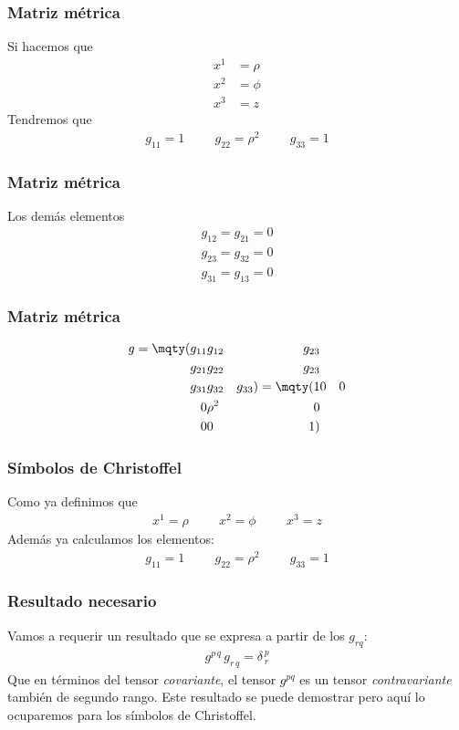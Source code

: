 \begin{frame}
\frametitle{Matriz métrica}
Si hacemos que 
\begin{align*}
x^{1} &= \rho \\[0.5em]
x^{2} &= \phi \\[0.5em]
x^{3} &= z
\end{align*}
\pause
Tendremos que
\begin{align*}
g_{11} = 1 \hspace{1cm} g_{22} = \rho^{2} \hspace{1cm} g_{33} = 1
\end{align*}
\end{frame}
\begin{frame}
\frametitle{Matriz métrica}
Los demás elementos
\begin{align*}
g_{12} = g_{21} = 0 \\[0.5em]
g_{23} = g_{32} = 0 \\[0.5em]
g_{31} = g_{13} = 0
\end{align*}
\end{frame}
\begin{frame}
\frametitle{Matriz métrica}
\begin{align*}
g = \mqty(
g_{11} & g_{12} & g_{23} \\
g_{21} & g_{22} & g_{23} \\
g_{31} & g_{32} & g_{33}
) = 
\mqty(
1 & 0 & 0 \\
0 & \rho^{2} & 0 \\
0 & 0 & 1
)
\end{align*}
\end{frame}
\begin{frame}
\frametitle{Símbolos de Christoffel}
Como ya definimos que
\begin{align*}
x^{1} = \rho \hspace{1cm} x^{2} = \phi \hspace{1cm} x^{3} = z
\end{align*}
\pause
Además ya calculamos los elementos:
\begin{align*}
g_{11} = 1 \hspace{1cm} g_{22} = \rho^{2} \hspace{1cm} g_{33} = 1
\end{align*}
\end{frame}
\begin{frame}
\frametitle{Resultado necesario}
Vamos a requerir un resultado que se expresa a partir de los $g_{rq}$:
\begin{align*}
g^{p \, q} \, g_{r \, q} = \delta_{\, r}^{\, p}
\end{align*}
\pause
Que en términos del tensor \emph{covariante}, el tensor $g^{pq}$ es un tensor \emph{contravariante} también de segundo rango. Este resultado se puede demostrar pero aquí lo ocuparemos para los símbolos de Christoffel.
\end{frame}
